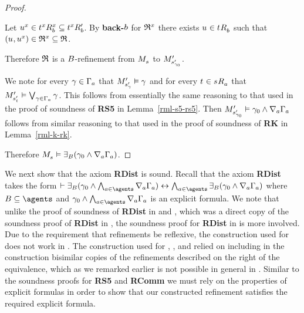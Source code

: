 \begin{proof}
\begin{description}
\begin{description}
                Let $\kStateU[x] \in \kSuccessorsB[x]{\kStateT[x]} \subseteq \kSuccessorsPB{\kStateT[x]}$.
                By {\bf back-$\agentB$} for $\refinement^x$ there exists $\kStateU \in \kSuccessorsB{\kStateT}$ such that $(\kStateU, \kStateU[x]) \in \refinement^x \subseteq \refinement$.
        \end{description}
\end{description}

Therefore $\refinement$ is a $\agentsB$-refinement from $\kPModel{\kStateS}$ to $\kPModelP{\kStateSP_{\gamma_0}}$.

We note for every $\gamma \in \Gamma_\agentA$ that $\kPModelP{\kStateSP_\gamma} \entails \gamma$ and for every $\kStateT \in \kSuccessorsA{\kStateS}$ that $\kPModelP{\kStateSP_{\kStateT}} \entails \bigvee_{\gamma \in \Gamma_\agentA} \gamma$.
This follows from essentially the same reasoning to that used in the proof of soundness of {\bf RS5} in Lemma~\ref{rml-s5-rs5}.
Then $\kPModelP{\kStateSP_{\gamma_0}} \entails \gamma_0 \land \coversA \Gamma_\agentA$ follows from similar reasoning to that used in the proof of soundness of {\bf RK} in Lemma~\ref{rml-k-rk}.

Therefore $\kPModel{\kStateS} \entails \somerefsBs (\gamma_0 \land \coversA \Gamma_\agentA)$.
\end{proof}

We next show that the axiom {\bf RDist} is sound.
Recall that the axiom {\bf RDist} takes the form $\proves \somerefsBs (\gamma_0 \land \bigwedge_{\agentA \in \agents} \coversA \Gamma_\agentA) \iff \bigwedge_{\agentA \in \agents} \somerefsBs (\gamma_0 \land \coversA \Gamma_\agentA)$ where $\agentsB \subseteq \agents$ and $\gamma_0 \land \bigwedge_{\agentA \in \agents} \coversA \Gamma_\agentA$ is an explicit formula.
We note that unlike the proof of soundness of {\bf RDist} in \logicRmlKFF{} and \logicRmlKD{}, which was a direct copy of the soundness proof of {\bf RDist} in \logicRmlK{}, the soundness proof for {\bf RDist} in \logicRmlS{} is more involved.
Due to the requirement that refinements be reflexive, the construction used for \logicRmlK{} does not work in \logicRmlS{}.
The construction used for \logicRmlK{}, \logicRmlKFF{}, and \logicRmlKD{} relied on including in the construction bisimilar copies of the refinements described on the right of the equivalence, which as we remarked earlier is not possible in general in \logicRmlS{}.
Similar to the soundness proofs for {\bf RS5} and {\bf RComm} we must rely on the properties of explicit formulas in order to show that our constructed refinement satisfies the required explicit formula.

